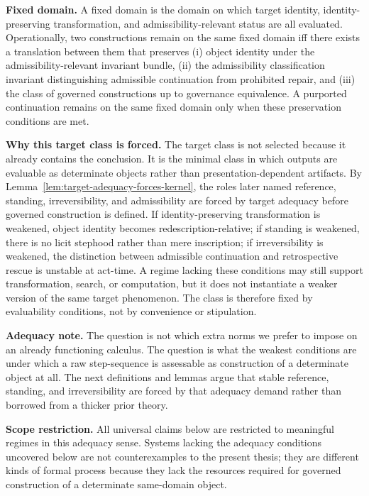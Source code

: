 \documentclass[11pt]{article}
\theoremstyle{definition}
\theoremstyle{remark}
\begin{document}
\medskip
\noindent\textbf{Fixed domain.} A fixed domain is the domain on which target identity, identity-preserving transformation, and admissibility-relevant status are all evaluated. Operationally, two constructions remain on the same fixed domain iff there exists a translation between them that preserves (i) object identity under the admissibility-relevant invariant bundle, (ii) the admissibility classification invariant distinguishing admissible continuation from prohibited repair, and (iii) the class of governed constructions up to governance equivalence. A purported continuation remains on the same fixed domain only when these preservation conditions are met.

\medskip
\noindent\textbf{Why this target class is forced.} The target class is not selected because it already contains the conclusion. It is the minimal class in which outputs are evaluable as determinate objects rather than presentation-dependent artifacts. By Lemma~\ref{lem:target-adequacy-forces-kernel}, the roles later named reference, standing, irreversibility, and admissibility are forced by target adequacy before governed construction is defined. If identity-preserving transformation is weakened, object identity becomes redescription-relative; if standing is weakened, there is no licit stephood rather than mere inscription; if irreversibility is weakened, the distinction between admissible continuation and retrospective rescue is unstable at act-time. A regime lacking these conditions may still support transformation, search, or computation, but it does not instantiate a weaker version of the same target phenomenon. The class is therefore fixed by evaluability conditions, not by convenience or stipulation.

\medskip
\noindent\textbf{Adequacy note.} The question is not which extra norms we prefer to impose on an already functioning calculus. The question is what the weakest conditions are under which a raw step-sequence is assessable as construction of a determinate object at all. The next definitions and lemmas argue that stable reference, standing, and irreversibility are forced by that adequacy demand rather than borrowed from a thicker prior theory.

\medskip
\noindent\textbf{Scope restriction.} All universal claims below are restricted to meaningful regimes in this adequacy sense. Systems lacking the adequacy conditions uncovered below are not counterexamples to the present thesis; they are different kinds of formal process because they lack the resources required for governed construction of a determinate same-domain object.
\end{document}

